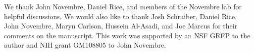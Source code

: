 We thank John Novembre, Daniel Rice, and members of the Novembre lab for helpful
discussions. We would also like to thank Josh Schraiber, Daniel Rice, John
Novembre, Maryn Carlson, Hussein Al-Asadi, and Joe Marcus for their comments on
the manuscript. This work was supported by an NSF GRFP to the author and NIH
grant GM108805 to John Novembre.
